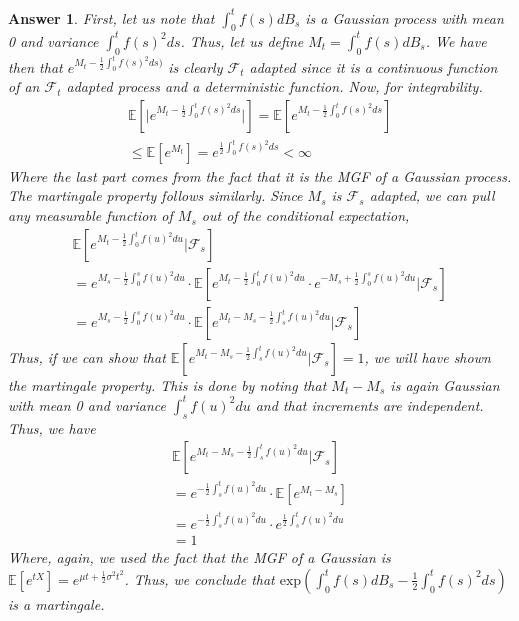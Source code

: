 \documentclass[12pt]{article}
\theoremstyle{colon}
\newtheorem*{answer}{Answer}
\begin{document}
\begin{answer}
  First, let us note that $\int_0^t f(s) d B_s$ is a Gaussian process with mean 0 and variance $\int_0^t f(s)^2 ds$. Thus, let us define $M_t = \int_0^t f(s) d B_s$. We have then that $e^{M_t - \frac{1}{2} \int_0^t f(s)^2 ds)}$ is clearly $\mathcal{F}_{t}$ adapted since it is a continuous function of an $\mathcal{F}_t$ adapted process and a deterministic function. Now, for integrability.
  \begin{gather*}
    \mathbb{E}[ \lvert e^{M_t - \frac{1}{2} \int_0^t f(s)^2 ds} \rvert] = \mathbb{E}[ e^{M_t - \frac{1}{2} \int_0^t f(s)^2 ds} ] \\
    \leq \mathbb{E}[ e^{M_t} ] = e^{\frac{1}{2} \int_0^t f(s)^2 ds} < \infty
  \end{gather*}
  Where the last part comes from the fact that it is the MGF of a Gaussian process. The martingale property follows similarly. Since $M_s$ is $\mathcal{F}_s$ adapted, we can pull any measurable function of $M_s$ out of the conditional expectation,
  \begin{gather*}
    \mathbb{E}[ e^{M_t - \frac{1}{2} \int_0^t f(u)^2 du} | \mathcal{F}_s] \\
    = e^{M_s - \frac{1}{2} \int_0^s f(u)^2 du} \cdot \mathbb{E}[ e^{M_t - \frac{1}{2} \int_0^t f(u)^2 du} \cdot e^{-M_s + \frac{1}{2} \int_0^s f(u)^2 du} | \mathcal{F}_s] \\
    = e^{M_s - \frac{1}{2} \int_0^s f(u)^2 du} \cdot \mathbb{E}[ e^{M_t - M_s - \frac{1}{2} \int_s^t f(u)^2 du} | \mathcal{F}_s]
  \end{gather*}
  Thus, if we can show that $\mathbb{E}[ e^{M_t - M_s - \frac{1}{2} \int_s^t f(u)^2 du} | \mathcal{F}_s] = 1$, we will have shown the martingale property. This is done by noting that $M_t - M_s$ is again Gaussian with mean 0 and variance $\int_s^t f(u)^2 du$ and that increments are independent. Thus, we have
  \begin{gather*}
    \mathbb{E}[ e^{M_t - M_s - \frac{1}{2} \int_s^t f(u)^2 du} | \mathcal{F}_s] \\
    = e^{- \frac{1}{2} \int_s^t f(u)^2 du} \cdot \mathbb{E}[ e^{M_t - M_s} ] \\
    = e^{- \frac{1}{2} \int_s^t f(u)^2 du} \cdot e^{\frac{1}{2} \int_s^t f(u)^2 du} \\
    = 1
  \end{gather*}
  Where, again, we used the fact that the MGF of a Gaussian is $\mathbb{E}[e^{t X}] = e^{\mu t + \frac{1}{2} \sigma^2 t^2}$. Thus, we conclude that $\text{exp}(\int_0^t f(s) d B_s - \frac{1}{2} \int_0^t f(s)^2 ds)$ is a martingale.


\end{answer}
\end{document}
